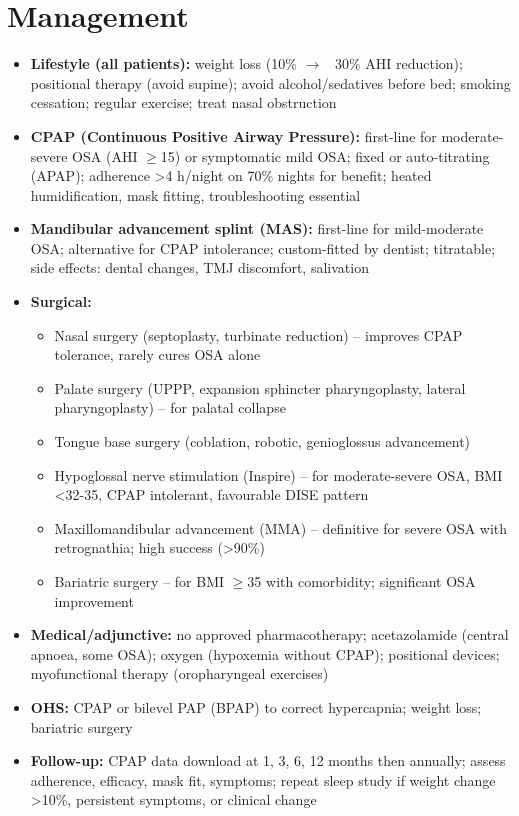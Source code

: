 \section*{Management}
\begin{itemize}
    \item \textbf{Lifestyle (all patients):} weight loss (10\% $\to$ ~30\% AHI reduction); positional therapy (avoid supine); avoid alcohol/sedatives before bed; smoking cessation; regular exercise; treat nasal obstruction
    \item \textbf{CPAP (Continuous Positive Airway Pressure):} first-line for moderate-severe OSA (AHI $\ge$15) or symptomatic mild OSA; fixed or auto-titrating (APAP); adherence >4 h/night on 70\% nights for benefit; heated humidification, mask fitting, troubleshooting essential
    \item \textbf{Mandibular advancement splint (MAS):} first-line for mild-moderate OSA; alternative for CPAP intolerance; custom-fitted by dentist; titratable; side effects: dental changes, TMJ discomfort, salivation
    \item \textbf{Surgical:}
    \begin{itemize}
        \item Nasal surgery (septoplasty, turbinate reduction) -- improves CPAP tolerance, rarely cures OSA alone
        \item Palate surgery (UPPP, expansion sphincter pharyngoplasty, lateral pharyngoplasty) -- for palatal collapse
        \item Tongue base surgery (coblation, robotic, genioglossus advancement)
        \item Hypoglossal nerve stimulation (Inspire) -- for moderate-severe OSA, BMI <32-35, CPAP intolerant, favourable DISE pattern
        \item Maxillomandibular advancement (MMA) -- definitive for severe OSA with retrognathia; high success (>90\%)
        \item Bariatric surgery -- for BMI $\ge$35 with comorbidity; significant OSA improvement
    \end{itemize}
    \item \textbf{Medical/adjunctive:} no approved pharmacotherapy; acetazolamide (central apnoea, some OSA); oxygen (hypoxemia without CPAP); positional devices; myofunctional therapy (oropharyngeal exercises)
    \item \textbf{OHS:} CPAP or bilevel PAP (BPAP) to correct hypercapnia; weight loss; bariatric surgery
    \item \textbf{Follow-up:} CPAP data download at 1, 3, 6, 12 months then annually; assess adherence, efficacy, mask fit, symptoms; repeat sleep study if weight change >10\%, persistent symptoms, or clinical change
\end{itemize}

